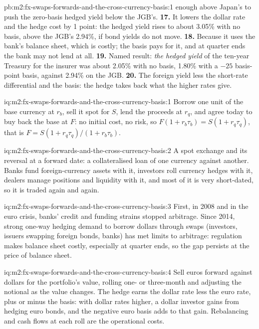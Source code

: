 \begin{solution}{pb:m2:fx-swaps-forwards-and-the-cross-currency-basis:1}
enough above Japan's to push the zero-basis hedged yield below the JGB's.
\textbf{17.} It lowers the dollar rate and the hedge cost by 1 point: the hedged
yield rises to about 3.05\% with no basis, above the JGB's 2.94\%, if bond yields
do not move.
\textbf{18.} Because it uses the bank's balance sheet, which is costly; the basis
pays for it, and at quarter ends the bank may not lend at all.
\textbf{19.} Named result: \emph{the hedged yield} of the ten-year Treasury for the
insurer was about 2.05\% with no basis, 1.80\% with a $-25$ basis-point basis,
against 2.94\% on the JGB.
\textbf{20.} The foreign yield less the short-rate differential and the basis:
the hedge takes back what the higher rates give.
\end{solution}

\begin{solution}{iq:m2:fx-swaps-forwards-and-the-cross-currency-basis:1}
Borrow one unit of the base currency at $r_b$, sell it spot for $S$, lend the
proceeds at $r_q$, and agree today to buy back the base at $F$: no initial cost,
no risk, so $F(1 + r_b\tau_b) = S(1 + r_q\tau_q)$, that is
$F = S(1 + r_q\tau_q)/(1 + r_b\tau_b)$.
\end{solution}

\begin{solution}{iq:m2:fx-swaps-forwards-and-the-cross-currency-basis:2}
A spot exchange and its reversal at a forward date: a collateralised loan of one
currency against another. Banks fund foreign-currency assets with it, investors
roll currency hedges with it, dealers manage positions and liquidity with it, and
most of it is very short-dated, so it is traded again and again.
\end{solution}

\begin{solution}{iq:m2:fx-swaps-forwards-and-the-cross-currency-basis:3}
First, in 2008 and in the euro crisis, banks' credit and funding strains stopped
arbitrage. Since 2014, strong one-way hedging demand to borrow dollars through
swaps (investors, issuers swapping foreign bonds, banks) has met limits to
arbitrage: regulation makes balance sheet costly, especially at quarter ends,
so the gap persists at the price of balance sheet.
\end{solution}

\begin{solution}{iq:m2:fx-swaps-forwards-and-the-cross-currency-basis:4}
Sell euros forward against dollars for the portfolio's value, rolling one- or
three-month  and adjusting the notional as the value changes. The hedge
earns the dollar rate less the euro rate, plus or minus the basis: with dollar
rates higher, a dollar investor gains from hedging euro bonds, and the negative
euro basis adds to that gain. Rebalancing and cash flows at each roll are the
operational costs.
\end{solution}

